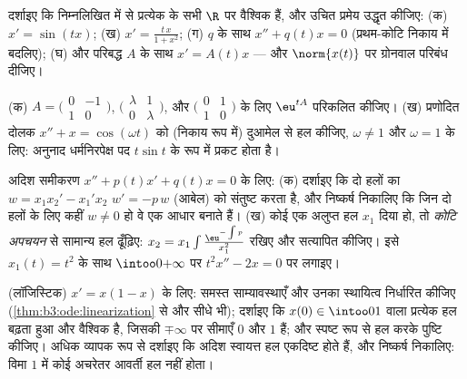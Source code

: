 \begin{exercise}[$\star\star$]\label{exo:b3:ode:3}
दर्शाइए कि निम्नलिखित में से प्रत्येक के सभी  $\R$ पर
वैश्विक हैं, और उचित प्रमेय उद्धृत कीजिए:
(क) $x' = \sin(tx)$;
(ख) $x' = \frac{t\,x}{1 + x^2}$;
(ग)  $q$ के साथ $x'' + q(t)x = 0$ (प्रथम-कोटि निकाय में बदलिए);
(घ)  और परिबद्ध $A$ के साथ $x' = A(t)x$ --- और $\norm{x(t)}$ पर ग्रोनवाल
परिबंध दीजिए।
\end{exercise}

\begin{exercise}[$\star\star$]\label{exo:b3:ode:4}
(क) $A = \bigl(\begin{smallmatrix}0 & -1\\ 1 &
0\end{smallmatrix}\bigr)$, $\bigl(\begin{smallmatrix}\lambda & 1\\ 0 &
\lambda\end{smallmatrix}\bigr)$, और $\bigl(\begin{smallmatrix}0 & 1\\ 1 &
0\end{smallmatrix}\bigr)$ के लिए $\eu^{tA}$ परिकलित कीजिए।
(ख) प्रणोदित दोलक $x'' + x = \cos(\omega t)$ को (निकाय रूप में) दुआमेल से हल कीजिए,
$\omega \neq 1$ और $\omega =
1$ के लिए: अनुनाद धर्मनिरपेक्ष पद $t\sin t$ के रूप में
प्रकट होता है।
\end{exercise}

\begin{exercise}[$\star\star$]\label{exo:b3:ode:5}
अदिश समीकरण $x'' + p(t)x' + q(t)x = 0$ के लिए:
(क) दर्शाइए कि दो हलों का  $w = x_1x_2' - x_1'x_2$ $w' = -p\,w$ (आबेल) को
संतुष्ट करता है, और निष्कर्ष निकालिए कि जिन दो हलों के लिए कहीं
$w \neq 0$ हो वे एक आधार बनाते हैं।
(ख) कोई एक अलुप्त हल $x_1$ दिया हो, तो \emph{कोटि अपचयन} से
सामान्य हल ढूँढ़िए: $x_2 = x_1\int
\frac{\eu^{-\int p}}{x_1^2}$ रखिए और सत्यापित कीजिए। इसे $x_1(t) = t^2$ के
साथ $\intoo0{+\infty}$ पर $t^2x'' -
2x = 0$ पर लगाइए।
\end{exercise}

\begin{exercise}[$\star\star$]\label{exo:b3:ode:6}
(लॉजिस्टिक) $x' = x(1 - x)$ के लिए: समस्त साम्यावस्थाएँ और उनका स्थायित्व
निर्धारित कीजिए (\cref{thm:b3:ode:linearization} से और सीधे भी); दर्शाइए कि $x(0) \in \intoo01$ वाला
प्रत्येक हल बढ़ता हुआ और वैश्विक है, जिसकी $\mp\infty$ पर सीमाएँ $0$
और $1$ हैं; और स्पष्ट रूप से हल करके पुष्टि कीजिए। अधिक व्यापक
रूप से दर्शाइए कि अदिश स्वायत्त हल एकदिष्ट होते हैं, और निष्कर्ष
निकालिए: विमा $1$ में कोई अचरेतर आवर्ती हल नहीं होता।
\end{exercise}


